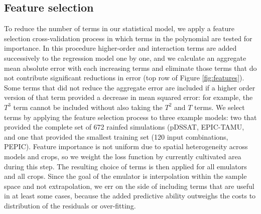 \documentclass[gmd, manuscript]{copernicus} %
\begin{document}
\subsection{Feature selection}
To reduce the number of terms in our statistical model, we apply a feature selection cross-validation process in which terms in the polynomial are tested for importance.
In this procedure higher-order and interaction terms are added successively to the regression model one by one, and 
we calculate an aggregate mean absolute error with each increasing terms and eliminate those terms that do not contribute significant reductions in error (top row of Figure \ref{fig:features}). 
Some terms that did not reduce the aggregate error are included if a higher order version of that term provided a decrease in mean squared error: for example, the $T^3$ term cannot be included without also taking the $T^2$ and $T$ terms. 
We select terms by applying the feature selection process to three example models: two that provided the complete set of 672 rainfed simulations (pDSSAT, EPIC-TAMU, and one that provided the smallest training set (120 input combinations, PEPIC). 
Feature importance is not uniform due to spatial heterogeneity across models and crops, so we weight the loss function by currently cultivated area during this step. 
The resulting choice of terms is then applied for all emulators and all crops. 
Since the goal of the emulator is interpolation within the sample space and not extrapolation, we err on the side of including terms that are useful in at least some cases, because the added predictive ability outweighs the costs to distribution of the residuals or over-fitting.  
\end{document}
